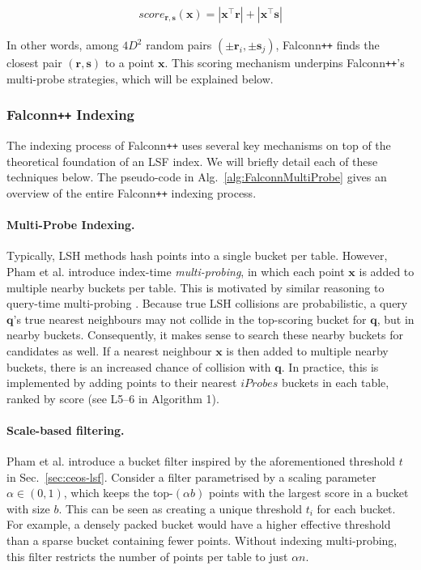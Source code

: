 \documentclass{article}
\newcommand{\bx}{\mathbf{x}}
\newcommand{\br}{\mathbf{r}}
\newcommand{\bs}{\mathbf{s}}
\newcommand{\bq}{\mathbf{q}}
\newcommand{\fpp}{Falconn\texttt{++}\xspace}
\begin{document}
\begin{equation}
    \label{eq:fpp-concat}
    \begin{aligned}
    score_{\br, \bs}(\bx)  = |\bx^\top \br| + |\bx^\top \bs|
    \end{aligned}
\end{equation}

In other words, among $4D^2$ random pairs $(\pm \br_i, \pm \bs_j)$, \fpp finds the closest pair $(\br, \bs)$ to a point $\bx$. This scoring mechanism underpins Falconn\texttt{++}'s multi-probe strategies, which will be explained below.

\subsubsection{\fpp Indexing}

The indexing process of \fpp uses several key mechanisms on top of the theoretical foundation of an LSF index. We will briefly detail each of these techniques below. The pseudo-code in Alg.~\ref{alg:FalconnMultiProbe} gives an overview of the entire \fpp indexing process.

\paragraph{Multi-Probe Indexing.} 

Typically, LSH methods hash points into a single bucket per table. However, Pham et al. introduce index-time \emph{multi-probing}, in which each point $\bx$ is added to multiple nearby buckets per table. This is motivated by similar reasoning to query-time multi-probing \cite{lv2007multi}. Because true LSH collisions are probabilistic, a query $\bq$'s true nearest neighbours may not collide in the top-scoring bucket for $\bq$, but in nearby buckets. Consequently, it makes sense to search these nearby buckets for candidates as well. If a nearest neighbour $\bx$ is then added to multiple nearby buckets, there is an increased chance of collision with $\bq$. In practice, this is implemented by adding points to their nearest $iProbes$ buckets in each table, ranked by score (see L5--6 in Algorithm 1). 

\paragraph{Scale-based filtering.} 

Pham et al. introduce a bucket filter inspired by the aforementioned threshold $t$ in Sec.~\ref{sec:ceos-lsf}. Consider a filter parametrised by a scaling parameter $\alpha \in (0,1)$, which keeps the top-$(\alpha b)$ points with the largest score in a bucket with size $b$. This can be seen as creating a unique threshold $t_i$ for each bucket. For example, a densely packed bucket would have a higher effective threshold than a sparse bucket containing fewer points. Without indexing multi-probing, this filter restricts the number of points per table to just $\alpha n$.
\end{document}
